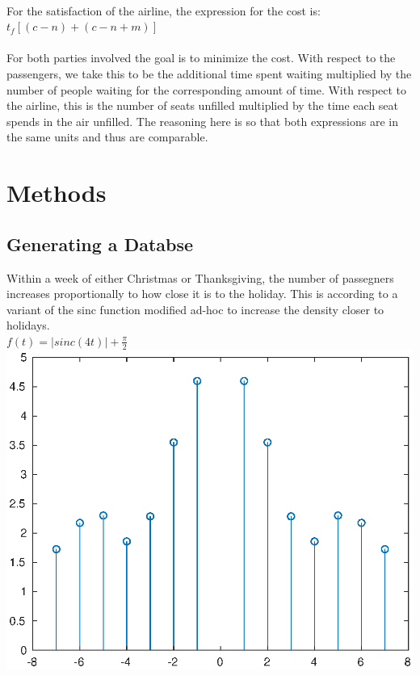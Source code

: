 \documentclass[12pt]{article}
\begin{document}
\\
For the satisfaction of the airline, the expression for the cost is: \\
$t_{f}[(c - n) + (c - n + m)]$ \\
\\
For both parties involved the goal is to minimize the cost. With respect to the passengers, we take this to be the additional time spent waiting multiplied by the number of people waiting for the corresponding amount of time. With respect to the airline, this is the number of seats unfilled multiplied by the time each seat spends in the air unfilled. The reasoning here is so that both expressions are in the same units and thus are comparable. \\

\section{Methods}
\subsection{Generating a Databse}
Within a week of either Christmas or Thanksgiving, the number of passegners increases proportionally to how close it is to the holiday. This is according to a variant of the sinc function modified ad-hoc to increase the density closer to holidays. \\
$f(t) = |sinc(4t)| + \frac{\pi}{2}$ \\
 
\includegraphics{sinc.eps}
\end{document}

